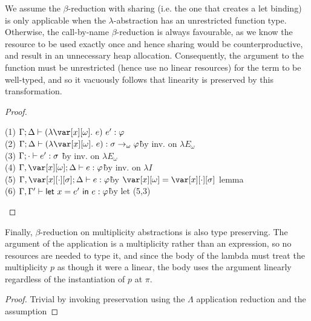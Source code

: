 \noindent We assume the $\beta$-reduction with sharing (i.e. the one that creates a let
binding) is only applicable when the $\lambda$-abstraction has an unrestricted
function type. Otherwise, the call-by-name $\beta$-reduction is always
favourable, as we know the resource to be used exactly once and hence sharing
would be counterproductive, and result in an unnecessary heap allocation.
%
Consequently, the argument to the function must be unrestricted (hence use no
linear resources) for the term to be well-typed, and so it vacuously follows
that linearity is preserved by this transformation.

\BetaReductionSharingTheorem

\begin{proof}~

\begin{tabbing}
    (1) $\G;\D \vdash (\lambda \xo.~e)~e' : \vp$\\
    (2) $\G; \D \vdash (\lambda \xo.~e) : \s \to_\omega \vp$\` by inv. on $\lambda E_\omega$\\
    (3) $\Gamma; \cdot \vdash e' : \sigma$ \` by inv. on $\lambda E_\omega$\\
    (4) $\G,\xo; \D \vdash e : \vp$\` by inv. on $\lambda I$\\
    (5) $\G, \x[\cdot][\s]; \D \vdash e : \vp$\` by $\xo = \x[\cdot][\s]$ lemma\\
    (6) $\Gamma,\Gamma' \vdash \mathsf{let}~x = e'~\mathsf{in}~e : \varphi$\` by let (5,3)\\
\end{tabbing}
\end{proof}

\noindent Finally, $\beta$-reduction on multiplicity abstractions is also type
preserving. The argument of the application is a multiplicity rather than an
expression, so no resources are needed to type it, and since the body of the
lambda must treat the multiplicity $p$ as though it were a linear, the body
uses the argument linearly regardless of the instantiation of $p$ at $\pi$.

\BetaReductionMultTheorem

\begin{proof}
    Trivial by invoking preservation using the $\Lambda$ application reduction and the assumption
\end{proof}


